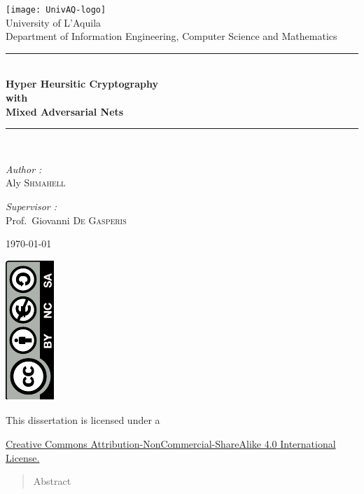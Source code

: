 \documentclass[12pt]{article}
\begin{document}
\begin{titlepage}
	\begin{center}
		\texttt{[image: UnivAQ-logo]}\\[1cm]
		{\large University of L'Aquila}\\[0.5cm]
		{\large Department of Information Engineering, Computer Science and Mathematics}\\[0.5cm]
		\rule{\linewidth}{0.5mm} \\[0.4cm]
		{\huge \bfseries Hyper Heursitic Cryptography\\
			with\\
			Mixed Adversarial Nets \\[0.4cm] }
		\rule{\linewidth}{0.5mm} \\[1.5cm]
		\noindent
		\begin{minipage}{0.4\textwidth}
			\begin{flushleft}
				\large
				\emph{Author :}\\
				Aly \textsc{Shmahell}
			\end{flushleft}
		\end{minipage}%
		\begin{minipage}{0.4\textwidth}
			\begin{flushleft}
				\large
				\emph{Supervisor :} \\
				Prof.~Giovanni \textsc{De Gasperis}\\
			\end{flushleft}
		\end{minipage}
		\vfill
		\today
	\end{center}
\end{titlepage}
\begin{titlepage}
		\begin{center}
			\includegraphics[angle=-90]{by-nc-sa}
		\end{center}
			\begin{center}
				This dissertation is licensed under a
			\end{center}
			\begin{center}
				 \href{http://creativecommons.org/licenses/by-nc-sa/4.0/}{Creative Commons Attribution-NonCommercial-ShareAlike 4.0 International License.}
			\end{center}
		
\end{titlepage}
\begin{abstract}
Abstract
\end{abstract}
\newpage
\end{document}
